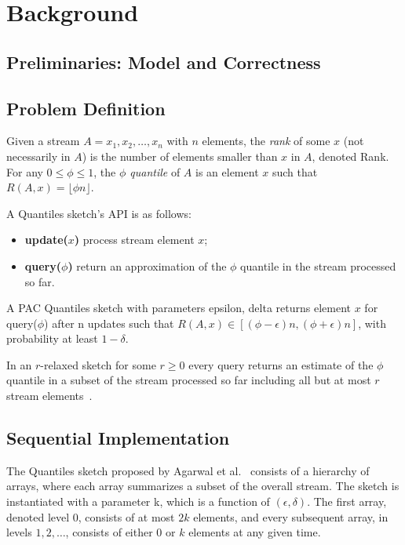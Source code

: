 \chapter{Background}
\label{chap:background}

\section{Preliminaries: Model and Correctness}
\label{sec:prelims}


\section{Problem Definition} \label{sec:problem_define}

Given a stream $A=x_1,x_2,\dots,x_n$ with $n$ elements,
the \emph{rank} of some $x$ (not necessarily in $A$) is the number of elements smaller than $x$ in $A$, denoted \gls{Rank}. For any $0 \leq \phi \leq 1$, the \emph{$\phi$ quantile} of $A$ is an element $x$ such that $R(A,x)=\lfloor \phi n \rfloor$.

A Quantiles sketch's \gls{API} is as follows:
\begin{itemize}
\item \textbf{update(}$x$\textbf{)} process stream element $x$;
\item \textbf{query(}$\phi$\textbf{)} return an approximation of the $\phi$ quantile in the stream processed so far. 
\end{itemize}
A PAC Quantiles sketch with parameters \gls{epsilon}, \gls{delta} returns element $x$ for query($\phi$) after n updates such that $R(A,x) \in \left[ (\phi-\epsilon)n,(\phi+\epsilon)n  \right]$, with probability at least $1-\delta$.

In an $r$-relaxed sketch for some $r\geq0$ every query returns an estimate of the $\phi$ quantile in a subset of the stream processed so far including all but at most $r$ stream elements~\cite{Henzinger_2013_Quantitative_Relaxation, Rinberg_2020_fast_sketches}.


\section{Sequential Implementation} \label{sec:seq_imp}


The Quantiles sketch proposed by Agarwal et al.~\cite{mergeables_summaries} consists of a hierarchy of arrays, where each array summarizes a subset of the overall stream. The sketch is instantiated with a parameter \gls{k}, which is a function of $(\epsilon,\delta)$. The first array, denoted level $0$, consists of at most $2k$ elements, and every subsequent array, in levels $1,2,\dots$, consists of either $0$ or $k$ elements at any given time.

